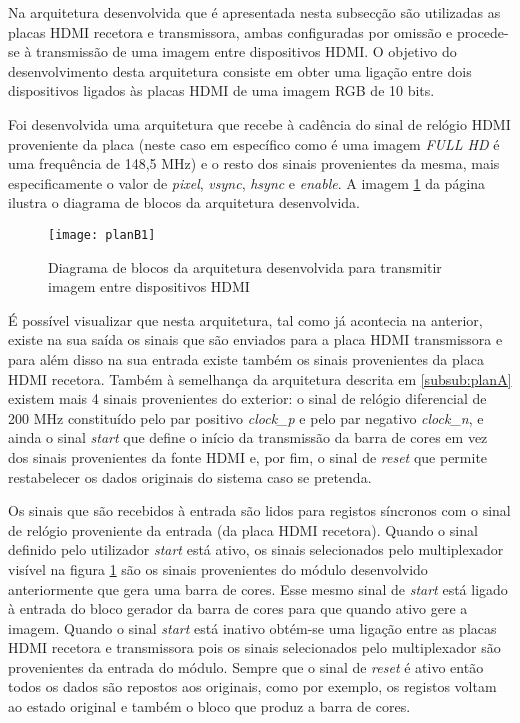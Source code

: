 Na arquitetura desenvolvida que é apresentada nesta subsecção são utilizadas as placas HDMI recetora e transmissora, ambas configuradas por omissão e procede-se à transmissão de uma imagem entre dispositivos HDMI. O objetivo do desenvolvimento desta arquitetura consiste em obter uma ligação entre dois dispositivos ligados às placas HDMI de uma imagem RGB de 10 bits.

Foi desenvolvida uma arquitetura que recebe à cadência do sinal de relógio HDMI proveniente da placa (neste caso em específico como é uma imagem \textit{FULL HD} é uma frequência de 148,5 MHz) e o resto dos sinais provenientes da mesma, mais especificamente o valor de \textit{pixel}, \textit{vsync}, \textit{hsync} e \textit{enable}. A imagem \ref{fig:planb1} da página \pageref{fig:planb1} ilustra o diagrama de blocos da arquitetura desenvolvida.

\begin{figure}[h!]
	\begin{center}
		\leavevmode
		\texttt{[image: planB1]}
		\caption{Diagrama de blocos da arquitetura desenvolvida para transmitir imagem entre dispositivos HDMI}
		\label{fig:planb1}
	\end{center}
\end{figure}

É possível visualizar que nesta arquitetura, tal como já acontecia na anterior, existe na sua saída os sinais que são enviados para a placa HDMI transmissora e para além disso na sua entrada existe também os sinais provenientes da placa HDMI recetora. Também à semelhança da arquitetura descrita em \ref{subsub:planA} existem mais 4 sinais provenientes do exterior: o sinal de relógio diferencial de 200 MHz constituído pelo par positivo \textit{clock\_p} e pelo par negativo \textit{clock\_n}, e ainda o sinal \textit{start} que define o início da transmissão da barra de cores em vez dos sinais provenientes da fonte HDMI e, por fim, o sinal de \textit{reset} que permite restabelecer os dados originais do sistema caso se pretenda.

Os sinais que são recebidos à entrada são lidos para registos síncronos com o sinal de relógio proveniente da entrada (da placa HDMI recetora). Quando o sinal definido pelo utilizador \textit{start} está ativo, os sinais selecionados pelo multiplexador visível na figura \ref{fig:planb1} são os sinais provenientes do módulo desenvolvido anteriormente que gera uma barra de cores. Esse mesmo sinal de \textit{start} está ligado à entrada do bloco gerador da barra de cores para que quando ativo gere a imagem. Quando o sinal \textit{start} está inativo obtém-se uma ligação entre as placas HDMI recetora e transmissora pois os sinais selecionados pelo multiplexador são provenientes da entrada do módulo. Sempre que o sinal de \textit{reset} é ativo então todos os dados são repostos aos originais, como por exemplo, os registos voltam ao estado original e também o bloco que produz a barra de cores.

